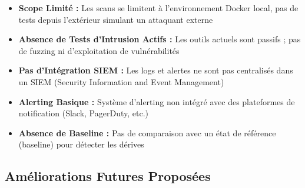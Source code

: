 \begin{itemize}
    \item \textbf{Scope Limité :} Les scans se limitent à l'environnement Docker local, pas de tests depuis l'extérieur simulant un attaquant externe
    \item \textbf{Absence de Tests d'Intrusion Actifs :} Les outils actuels sont passifs ; pas de fuzzing ni d'exploitation de vulnérabilités
    \item \textbf{Pas d'Intégration SIEM :} Les logs et alertes ne sont pas centralisés dans un SIEM (Security Information and Event Management)
    \item \textbf{Alerting Basique :} Système d'alerting non intégré avec des plateformes de notification (Slack, PagerDuty, etc.)
    \item \textbf{Absence de Baseline :} Pas de comparaison avec un état de référence (baseline) pour détecter les dérives
\end{itemize}

\subsection{Améliorations Futures Proposées}

